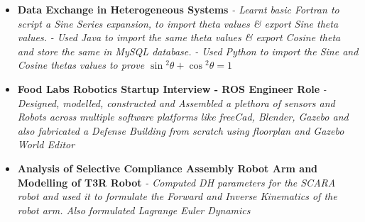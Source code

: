 \documentclass{article}
\begin{document}
\begin{itemize}
        \item{\textbf{\large{Data Exchange in Heterogeneous Systems}}}
        \newline
        \textit{- Learnt basic Fortran to script a Sine Series expansion, to import theta values \& export Sine theta values.}
        \newline
        \textit{- Used Java to import the same theta values \& export Cosine theta and store the same in MySQL database.}
        \newline
        \textit{- Used Python to import the Sine and Cosine thetas values to prove $\sin{^2\theta} + \cos{^2\theta} = 1$ }
        \item{\textbf{\large{Food Labs Robotics Startup Interview - ROS Engineer Role}}}
        \newline
        \textit{- Designed, modelled, constructed and
        Assembled a plethora of sensors and Robots across multiple software platforms like
        freeCad, Blender, Gazebo and also fabricated a Defense Building from scratch using floorplan and Gazebo World Editor}
        \item{\textbf{\large{Analysis of Selective Compliance Assembly Robot Arm and Modelling of T3R Robot}}}
        \newline
        \textit{- Computed DH parameters for the SCARA robot and used it to formulate the Forward and Inverse Kinematics of the robot arm. Also formulated Lagrange Euler Dynamics}
    \end{itemize}
\end{document}

